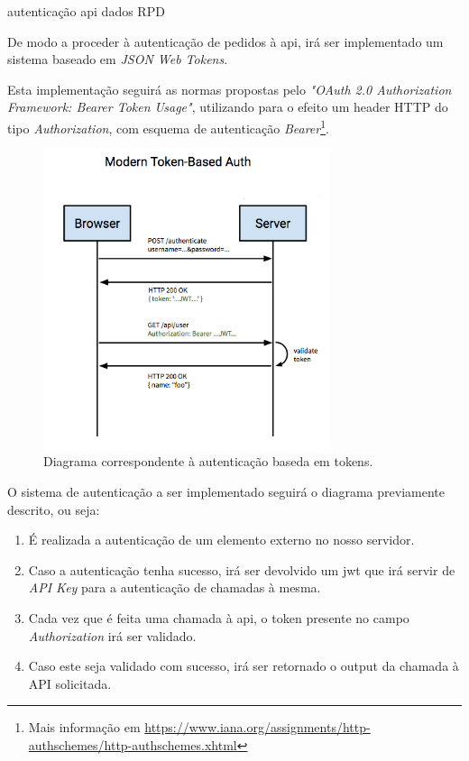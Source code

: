 autenticação api dados RPD

De modo a proceder à autenticação de pedidos à \gls{api}, irá ser implementado um sistema baseado em \emph{JSON Web Tokens}.

Esta implementação seguirá as normas propostas pelo \emph{"OAuth 2.0 Authorization Framework: Bearer Token Usage"}\cite{rfc6750}, utilizando para o efeito um header HTTP do tipo \emph{Authorization}, com esquema de autenticação \emph{Bearer}\footnote{Mais informação em \url{https://www.iana.org/assignments/http-authschemes/http-authschemes.xhtml}}.

\begin{figure}[h]
    \centering
    \includegraphics[width=0.75\textwidth]{img/jwt/diagramafluxoJWT.png}
    \caption{Diagrama correspondente à autenticação baseda em tokens. \cite{jwtDiagram}}
\end{figure}

O sistema de autenticação a ser implementado seguirá o diagrama previamente descrito, ou seja:

\begin{enumerate}
    \item É realizada a autenticação de um elemento externo no nosso servidor.
    \item Caso a autenticação tenha sucesso, irá ser devolvido um \gls{jwt} que irá servir de \emph{API Key} para a autenticação de chamadas à mesma.
    \item Cada vez que é feita uma chamada à \gls{api}, o token presente no campo \emph{Authorization} irá ser validado.
    \item Caso este seja validado com sucesso, irá ser retornado o output da chamada à API solicitada.
\end{enumerate}

